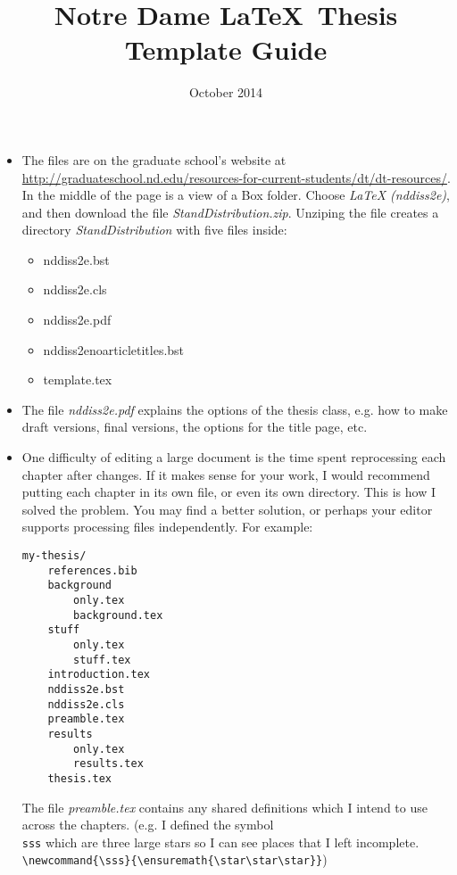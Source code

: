 \documentclass{article}
\begin{document}
\title{Notre Dame \LaTeX\ Thesis Template Guide}
\date{October 2014}
\maketitle

\begin{itemize}
\item The files are on the graduate school's website at \url{http://graduateschool.nd.edu/resources-for-current-students/dt/dt-resources/}.
In the middle of the page is a view of a Box folder. Choose \textit{LaTeX (nddiss2e)}, and then download the file \textit{StandDistribution.zip}.
Unziping the file creates a directory \textit{StandDistribution} with five files inside:

\begin{itemize}
	\item nddiss2e.bst
	\item nddiss2e.cls
	\item nddiss2e.pdf
	\item nddiss2enoarticletitles.bst
	\item template.tex
\end{itemize}

\item The file \textit{nddiss2e.pdf} explains the options of the thesis class, e.g. how to make draft versions, final versions, the options for the title page, etc.

\item One difficulty of editing a large document is the time spent reprocessing each chapter after changes.
    If it makes sense for your work, I would recommend putting each chapter in its own file, or even its own directory.
    This is how I solved the problem.
    You may find a better solution, or perhaps your editor supports processing files independently.
    For example:

\begin{verbatim}
my-thesis/
    references.bib
    background
        only.tex
        background.tex
    stuff
        only.tex
        stuff.tex
    introduction.tex
    nddiss2e.bst
    nddiss2e.cls
    preamble.tex
    results
        only.tex
        results.tex
    thesis.tex
\end{verbatim}

The file \textit{preamble.tex} contains any shared definitions which I intend to use across the chapters.
(e.g. I defined the symbol \texttt{\\sss} which are three large stars so I can see places that I left incomplete.
\verb=\newcommand{\sss}{\ensuremath{\star\star\star}}=)


\end{itemize}
\end{document}
